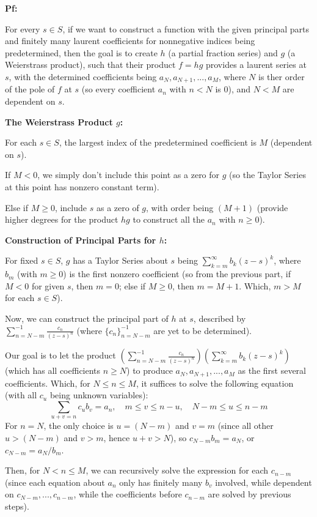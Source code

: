\documentclass{article}
\begin{document}
\textbf{Pf:}

For every $s\in S$, if we want to construct a function with the given principal parts and finitely many laurent coefficients for nonnegative indices being predetermined,
then the goal is to create $h$ (a partial fraction series) and $g$ (a Weierstrass product), such that their product $f=hg$ provides a laurent series at $s$,
with the determined coefficients being $a_N, a_{N+1},...,a_M$, where $N$ is ther order of the pole of $f$ at $s$ (so every coefficient $a_n$ with $n<N$ is $0$), and $N<M$ are dependent on $s$.

\hfil

\textbf{The Weierstrass Product $g$:}

For each $s\in S$, the largest index of the predetermined coefficient is $M$ (dependent on $s$). 

If $M<0$, we simply don't include this point as a zero for $g$ (so the Taylor Series at this point has nonzero constant term).

Else if $M\geq 0$, include $s$ as a zero of $g$, with order being $(M+1)$ (provide higher degrees for the product $hg$ to construct all the $a_n$ with $n\geq 0$).

\hfil

\textbf{Construction of Principal Parts for $h$:}

For fixed $s\in S$, $g$ has a Taylor Series about $s$ being $\sum_{k=m}^{\infty}b_k(z-s)^k$, where $b_m$ (with $m\geq 0$) is the first nonzero coefficient
(so from the previous part, if $M<0$ for given $s$, then $m=0$; else if $M\geq 0$, then $m=M+1$. Which, $m>M$ for each $s\in S$).

Now, we can construct the principal part of $h$ at $s$, described by $\sum_{n=N-m}^{-1}\frac{c_n}{(z-s)^n}$ (where $\{c_n\}_{n=N-m}^{-1}$ are yet to be determined).

Our goal is to let the product $(\sum_{n=N-m}^{-1}\frac{c_n}{(z-s)^n})(\sum_{k=m}^{\infty}b_k(z-s)^k)$ (which has all coefficients $n\geq N$) to produce $a_N,a_{N+1},...,a_M$ as the first several coefficients.
Which, for $N\leq n\leq M$, it suffices to solve the following equation (with all $c_u$ being unknown variables):
$$\sum_{u+v=n}c_ub_v = a_n,\quad m\leq v\leq n-u,\quad N-m\leq u\leq n-m$$
For $n=N$, the only choice is $u=(N-m)$ and $v=m$ (since all other $u> (N-m)$ and $v> m$, hence $u+v> N$), so $c_{N-m}b_m = a_N$, or $c_{N-m}=a_N/b_m$.

Then, for $N<n\leq M$, we can recursively solve the expression for each $c_{n-m}$ (since each equation about $a_n$ only has finitely many $b_v$ involved, while dependent on $c_{N-m},...,c_{n-m}$, while the coefficients before $c_{n-m}$ are solved by previous steps).
\end{document}

